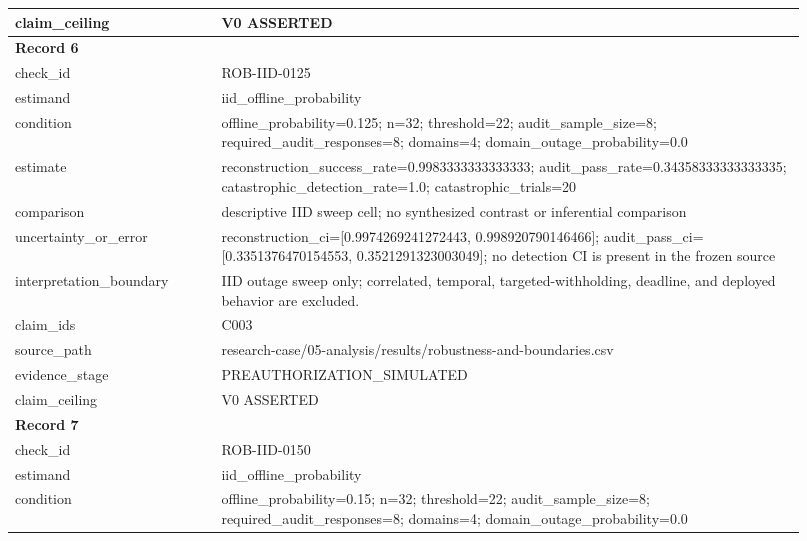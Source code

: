 \begin{longtable}{|p{0.24\linewidth}|p{0.68\linewidth}|}
claim\_\allowbreak{}ceiling & V0 ASSERTED \\ \hline
\multicolumn{2}{|l|}{\textbf{Record 6}} \\ \hline
check\_\allowbreak{}id & ROB-IID-0125 \\ \hline
estimand & iid\_\allowbreak{}offline\_\allowbreak{}probability \\ \hline
condition & offline\_\allowbreak{}probability=0.125;\allowbreak{} n=32;\allowbreak{} threshold=22;\allowbreak{} audit\_\allowbreak{}sample\_\allowbreak{}size=8;\allowbreak{} required\_\allowbreak{}audit\_\allowbreak{}responses=8;\allowbreak{} domains=4;\allowbreak{} domain\_\allowbreak{}outage\_\allowbreak{}probability=0.0 \\ \hline
estimate & reconstruction\_\allowbreak{}success\_\allowbreak{}rate=0.9983333333333333;\allowbreak{} audit\_\allowbreak{}pass\_\allowbreak{}rate=0.34358333333333335;\allowbreak{} catastrophic\_\allowbreak{}detection\_\allowbreak{}rate=1.0;\allowbreak{} catastrophic\_\allowbreak{}trials=20 \\ \hline
comparison & descriptive IID sweep cell;\allowbreak{} no synthesized contrast or inferential comparison \\ \hline
uncertainty\_\allowbreak{}or\_\allowbreak{}error & reconstruction\_\allowbreak{}ci=[0.9974269241272443, 0.998920790146466];\allowbreak{} audit\_\allowbreak{}pass\_\allowbreak{}ci=[0.3351376470154553, 0.3521291323003049];\allowbreak{} no detection CI is present in the frozen source \\ \hline
interpretation\_\allowbreak{}boundary & IID outage sweep only;\allowbreak{} correlated, temporal, targeted-withholding, deadline, and deployed behavior are excluded. \\ \hline
claim\_\allowbreak{}ids & C003 \\ \hline
source\_\allowbreak{}path & research-case/05-analysis/results/robustness-and-boundaries.csv \\ \hline
evidence\_\allowbreak{}stage & PREAUTHORIZATION\_\allowbreak{}SIMULATED \\ \hline
claim\_\allowbreak{}ceiling & V0 ASSERTED \\ \hline
\multicolumn{2}{|l|}{\textbf{Record 7}} \\ \hline
check\_\allowbreak{}id & ROB-IID-0150 \\ \hline
estimand & iid\_\allowbreak{}offline\_\allowbreak{}probability \\ \hline
condition & offline\_\allowbreak{}probability=0.15;\allowbreak{} n=32;\allowbreak{} threshold=22;\allowbreak{} audit\_\allowbreak{}sample\_\allowbreak{}size=8;\allowbreak{} required\_\allowbreak{}audit\_\allowbreak{}responses=8;\allowbreak{} domains=4;\allowbreak{} domain\_\allowbreak{}outage\_\allowbreak{}probability=0.0 \\ \hline

\end{longtable}
